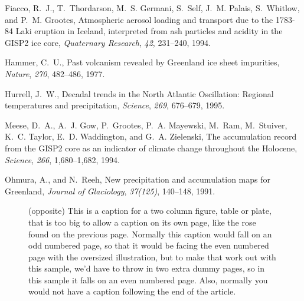 \documentclass[jgrga]{agu2001}
\begin{document}
\begin{article}
\begin{thebibliography}{}
Fiacco, R.~J., T.~Thordarson, M.~S. Germani, S.~Self, J.~M. Palais,
  S.~Whitlow, and P.~M. Grootes, {Atmospheric aerosol loading and transport due
  to the 1783-84 Laki eruption in Iceland, interpreted from ash particles and
  acidity in the GISP2 ice core}, {\it Quaternary Research}, {\it 42},
  231--240, 1994.

Hammer, C.~U., {Past volcanism revealed by Greenland ice sheet impurities},
  {\it Nature}, {\it 270}, 482--486, 1977.


Hurrell, J.~W., {Decadal trends in the North Atlantic Oscillation: Regional
temperatures and precipitation}, {\it Science}, {\it 269}, 676--679, 1995.


Meese, D.~A., A.~J. Gow, P.~Grootes, P.~A. Mayewski, M.~Ram, M.~Stuiver, K.~C.
  Taylor, E.~D. Waddington, and G.~A. Zielenski, {The accumulation record from
  the GISP2 core as an indicator of climate change throughout the {Holocene}},
  {\it Science}, {\it 266}, 1,680--1,682, 1994.


Ohmura, A., and N.~Reeh, {New precipitation and accumulation maps for
  Greenland}, {\it Journal of Glaciology}, {\it 37(125)}, 140--148, 1991.
\end{thebibliography}

\nonewpage %

\ifpal\else\iftec\else
\begin{figure*}[h]
\vskip-24pt
\topline
\caption{(opposite)
This is a caption for a two column figure, table or plate, 
that is too big to allow a caption on its own page,
like the
rose found on the previous page. Normally this caption
would fall on an odd numbered page, so that it would
be facing the even numbered page with the oversized
illustration, but to make that work out with this
sample, we'd have to throw in two extra dummy pages,
so in this sample it falls on an even numbered page.
Also, normally you would not have a caption following
the end of the article.
}
\label{extrafig}
\end{figure*}
\fi\fi
\end{article}
\end{document}
